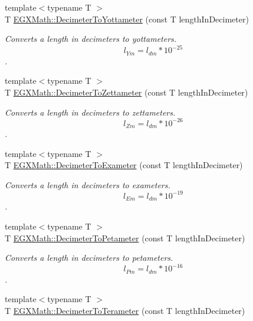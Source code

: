 \begin{DoxyCompactItemize}
{\footnotesize template$<$typename T $>$ }\\T \mbox{\hyperlink{group___e_g_x_math-_conversions-_length_conversions-_s_i-_decimeter-_s_i_ga47bb0274bb352706479e9f103686669b}{E\+G\+X\+Math\+::\+Decimeter\+To\+Yottameter}} (const T length\+In\+Decimeter)
\begin{DoxyCompactList}\small\item\em Converts a length in decimeters to yottameters. \[ l_{Ym}=l_{dm} * 10^{-25} \]. \end{DoxyCompactList}\item 
{\footnotesize template$<$typename T $>$ }\\T \mbox{\hyperlink{group___e_g_x_math-_conversions-_length_conversions-_s_i-_decimeter-_s_i_ga11b07d4dcd18209ab0b2cb3b2f0bdb59}{E\+G\+X\+Math\+::\+Decimeter\+To\+Zettameter}} (const T length\+In\+Decimeter)
\begin{DoxyCompactList}\small\item\em Converts a length in decimeters to zettameters. \[ l_{Zm}=l_{dm} * 10^{-26} \]. \end{DoxyCompactList}\item 
{\footnotesize template$<$typename T $>$ }\\T \mbox{\hyperlink{group___e_g_x_math-_conversions-_length_conversions-_s_i-_decimeter-_s_i_ga9ee5daca58b2e6431c94ca9b8d5180b6}{E\+G\+X\+Math\+::\+Decimeter\+To\+Exameter}} (const T length\+In\+Decimeter)
\begin{DoxyCompactList}\small\item\em Converts a length in decimeters to exameters. \[ l_{Em}=l_{dm} * 10^{-19} \]. \end{DoxyCompactList}\item 
{\footnotesize template$<$typename T $>$ }\\T \mbox{\hyperlink{group___e_g_x_math-_conversions-_length_conversions-_s_i-_decimeter-_s_i_gaaaaf9805ec7a853f4d9ae242baf3908a}{E\+G\+X\+Math\+::\+Decimeter\+To\+Petameter}} (const T length\+In\+Decimeter)
\begin{DoxyCompactList}\small\item\em Converts a length in decimeters to petameters. \[ l_{Pm}=l_{dm} * 10^{-16} \]. \end{DoxyCompactList}\item 
{\footnotesize template$<$typename T $>$ }\\T \mbox{\hyperlink{group___e_g_x_math-_conversions-_length_conversions-_s_i-_decimeter-_s_i_ga182e057812e247aa0058051c08e29bee}{E\+G\+X\+Math\+::\+Decimeter\+To\+Terameter}} (const T length\+In\+Decimeter)

\end{DoxyCompactItemize}
